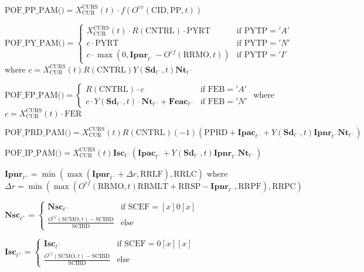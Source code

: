 \documentclass[10pt,a4paper,twoside]{article}
\begin{document}
$\boxed{
    \text{POF\_PP\_PAM()} = X_{\text{CUR}}^{\text{CURS}}(t) \cdot f(O^{ev}(\text{CID}, \text{PP}, t))
}$

$\boxed{
    \text{POF\_PY\_PAM()} = 
    \begin{cases}
        X_{\text{CUR}}^{\text{CURS}}(t) \cdot R(\text{CNTRL}) \cdot \text{PYRT} & \text{if PYTP} = 'A' \\
        c \cdot \text{PYRT} & \text{if PYTP} = 'N' \\
        c \cdot \max(0, \mathbf{Ipnr}_{t^{-}} - O^{rf}(\text{RRMO}, t)) & \text{if PYTP} = 'I'
    \end{cases}
}$
where $c = X_{\text{CUR}}^{\text{CURS}}(t) R(\text{CNTRL}) Y(\mathbf{Sd}_{t^{-}}, t) \mathbf{Nt}_{t^{-}}$

$\boxed{
    \text{POF\_FP\_PAM()} = 
    \begin{cases}
        R(\text{CNTRL}) \cdot c & \text{if FEB} = 'A' \\
        c \cdot Y(\mathbf{Sd}_{t^{-}}, t) \cdot \mathbf{Nt}_{t^{-}} + \mathbf{Feac}_{t^{-}} & \text{if FEB} = 'N'
    \end{cases}
}$
where $c = X_{\text{CUR}}^{\text{CURS}}(t) \cdot \text{FER}$

$\boxed{
    \text{POF\_PRD\_PAM()} = X_{\text{CUR}}^{\text{CURS}}(t) R(\text{CNTRL})(-1)(\text{PPRD} + \mathbf{Ipac}_{t^{-}} + Y(\mathbf{Sd}_{t^{-}}, t) \mathbf{Ipnr}_{t^{-}} \mathbf{Nt}_{t^{-}})
}$

$\boxed{
    \text{POF\_IP\_PAM()} = X_{\text{CUR}}^{\text{CURS}}(t) \mathbf{Isc}_{t^{-}} (\mathbf{Ipac}_{t^{-}} + Y(\mathbf{Sd}_{t^{-}}, t) \mathbf{Ipnr}_{t^{-}} \mathbf{Nt}_{t^{-}})
}$

$\boxed{
    \mathbf{Ipnr}_{t^{+}} = \min(\max(\mathbf{Ipnr}_{t^{-}} + \Delta r, \text{RRLF}), \text{RRLC})
}$
where $\Delta r = \min(\max(O^{rf}(\text{RRMO}, t)\text{RRMLT} + \text{RRSP} - \mathbf{Ipnr}_{t^{-}}, \text{RRPF}), \text{RRPC})$

$\boxed{
    \mathbf{Nsc}_{t^{+}} = 
    \begin{cases}
        \mathbf{Nsc}_{t^{-}} & \text{if } \text{SCEF} = [x]0[x] \\
        \frac{O^{rf}(\text{SCMO}, t) - \text{SCIBD}}{\text{SCIBD}} & \text{else}
    \end{cases}
}$

$\boxed{
    \mathbf{Isc}_{t^{+}} = 
    \begin{cases}
        \mathbf{Isc}_{t^{-}} & \text{if } \text{SCEF} = 0[x][x] \\
        \frac{O^{rf}(\text{SCMO}, t) - \text{SCIBD}}{\text{SCIBD}} & \text{else}
    \end{cases}
}$
\end{document}
